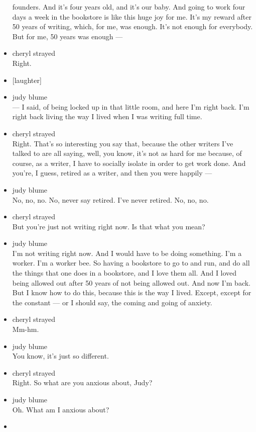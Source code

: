\begin{itemize}
  founders. And it's four years old, and it's our baby. And going to
  work four days a week in the bookstore is like this huge joy for me.
  It's my reward after 50 years of writing, which, for me, was enough.
  It's not enough for everybody. But for me, 50 years was enough ---
\item
  cheryl strayed\\
  Right.
\item
  {[}laughter{]}
\item
  judy blume\\
  --- I said, of being locked up in that little room, and here I'm right
  back. I'm right back living the way I lived when I was writing full
  time.
\item
  cheryl strayed\\
  Right. That's so interesting you say that, because the other writers
  I've talked to are all saying, well, you know, it's not as hard for me
  because, of course, as a writer, I have to socially isolate in order
  to get work done. And you're, I guess, retired as a writer, and then
  you were happily ---
\item
  judy blume\\
  No, no, no. No, never say retired. I've never retired. No, no, no.
\item
  cheryl strayed\\
  But you're just not writing right now. Is that what you mean?
\item
  judy blume\\
  I'm not writing right now. And I would have to be doing something. I'm
  a worker. I'm a worker bee. So having a bookstore to go to and run,
  and do all the things that one does in a bookstore, and I love them
  all. And I loved being allowed out after 50 years of not being allowed
  out. And now I'm back. But I know how to do this, because this is the
  way I lived. Except, except for the constant --- or I should say, the
  coming and going of anxiety.
\item
  cheryl strayed\\
  Mm-hm.
\item
  judy blume\\
  You know, it's just so different.
\item
  cheryl strayed\\
  Right. So what are you anxious about, Judy?
\item
  judy blume\\
  Oh. What am I anxious about?
\item

\end{itemize}
